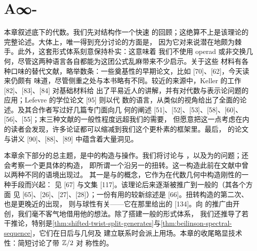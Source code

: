 \part{A∞-\trCategory}
本章叙述\trFukayaCategory{}底下的\trHomology{}代数。我们先对\trAinfty{}结构作一个快速
的回顾；这绝算不上是该理论的完整论述。大体上，唯一得到充分讨论的方面是\trIdentityMorphism，
因为它对\trFukayaCategory{}来说潜在地颇为棘手。此外，这套形式体系刻意保持朴实：这意味着
我们不使用 operad 或非交换几何，尽管这两种语言各自都能为这团公式乱麻带来不少启示。关于这些
材料有各种口味的替代文献，略举数条：一些奠基性的早期论文，比如 [70]、[62]，今天读来仍颇有
味道，尽管侧重之处与本书略有不同。较近的来源中，Keller 的工作 [82]、[83]、[84] 对基础材料给
出了平易近人的讲解，并有对代数与表示论问题的应用；Lefevre 的学位论文 [95] 则以\trHomotopy{}代
数的语言，从类似的视角给出了全面的论述。\trFukaya{}及其合作者写过好几篇专门面向\trSymplectic{}几
何的阐述 [51]、[52]、[53]、[58]、[60]、[56]、[55]；末三种文献的一般性程度远超我们的需要，
但愿意把这一点考虑在内的读者会发现，许多论证都可以缩减到我们这个更朴素的框架里。最后，
\trKontsevich{}的论文与讲义 [90]、[88]、[89] 中蕴含着大量洞见。

本章余下部分的总主题，是\trACategory{}中\trObject{}的构造与操作。我们将讨论\trMappingCone{}与%
\trExactTriangle，以及\trObject{}\trSplitting{}为\trDirectSummand{}的问题；还会考察一个更具体的构造，
即所谓一个\trObject{}沿另一\trObject{}的扭转。这一构造此前在文献中曾以两种不同的语境出现过。
其一是\trExceptionalCollection{}与\trMutation{}的概念，它作为在代数几何中构造刚性\trVectorBundle{}的一种手段而兴起：
见 [67] 与文集 [117]。该理论后来逐渐被推广到一般的\trTriangulated{}\trCategory（其各个方面
见 [65]、[26]、[27]、[28]）；一份有用的较新综述是 [66]。扭转构造的第二次、也是更晚近的出现，
则与球性\trObject{}有关——它在那里给出\trDerivedCategory{}的\trAutomorphism{} [134]。向%
\trACategory{}的推广由\trKontsevich{}开创，我们毫不客气地借用他的想法。除了搭建一般的形式体系，
我们还推导了若干推论，特别是\cref{thm:shifted-twist-split-generates}与\cref{thm:beilinson-spectral-sequence}，它们在日后与\trSymplectic{}几何及%
\trLefschetzFibration{}建立联系时会派上用场。本章的收尾略显技术性：简短讨论了带 $\mathbb{Z}/2$ 对
称性的\trACategory。
